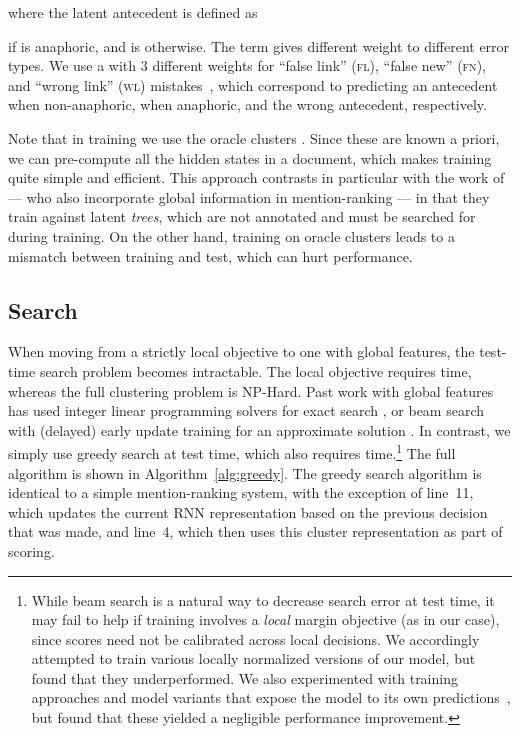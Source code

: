 \documentclass[11pt,letterpaper]{article}
\begin{document}
\vspace{-5mm}
{\small}

\vspace{-5mm}
\noindent where the latent antecedent  is defined as

\vspace{-5mm}

if  is anaphoric, and is  otherwise. The term  gives different
weight to different error types. We
use a  with 3 different weights
 for ``false link'' (\textsc{fl}), ``false new'' (\textsc{fn}), and ``wrong link'' (\textsc{wl}) mistakes~\cite{DandK:13}, which correspond to predicting an antecedent when non-anaphoric,  when anaphoric, and the wrong antecedent, respectively.

Note that in training we use the oracle clusters . Since these are known a priori, we can pre-compute all the hidden states  in a document, which makes training quite simple and efficient. This approach contrasts in particular with the work of  --- who also incorporate global information in mention-ranking --- in that they train against latent \textit{trees}, which are not annotated and must be searched for during training. On the other hand, training on oracle clusters leads to a mismatch between training and test, which can hurt performance.

\subsection{Search}
When moving from a strictly local objective to one with
global features, the test-time search problem becomes intractable. The
local objective requires  time, whereas the full clustering problem is NP-Hard. Past work with global features has used integer linear programming solvers for exact search
\cite{Chang:13,peng15a}, or beam search with (delayed) early update training for an
approximate solution \cite{BandK:14}. In contrast, we simply use greedy search at
test time, which also requires  time.\footnote{While beam search is a natural way to decrease search error at test time, it may fail to help if training involves a \textit{local} margin objective (as in our case), since scores need not be calibrated across local decisions. We accordingly attempted to train various locally normalized versions of our model, but found that they underperformed. 
We also experimented with training approaches and model variants that expose the model to its own predictions~\cite{daume09search,ross11a,bengio15scheduled}, but found that these yielded a negligible performance improvement.} The full algorithm is shown in Algorithm~\ref{alg:greedy}. The greedy search algorithm is identical to a simple mention-ranking system, with the exception of line~11, which updates the current RNN representation based on the previous decision that was made, and line~4, which then uses this
cluster representation as part of scoring. 
 
\end{document}
